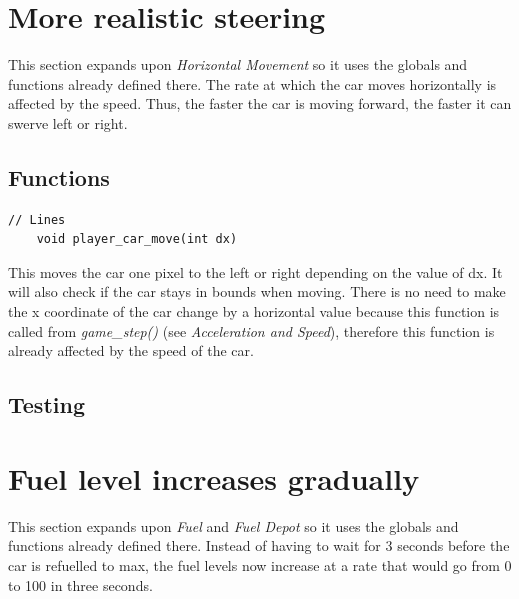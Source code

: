 \documentclass{article}
\begin{document}
\clearpage

\section{More realistic steering}
This section expands upon \emph{Horizontal Movement} so it uses the globals and functions already defined there. The rate at which the car moves horizontally is affected by the speed. Thus, the faster the car is moving forward, the faster it can swerve left or right.

\subsection*{Functions}
\begin{lstlisting}[style=CStyle]
	// Lines
	void player_car_move(int dx)
\end{lstlisting}
This moves the car one pixel to the left or right depending on the value of dx. It will also check if the car stays in bounds when moving. There is no need to make the x coordinate of the car change by a horizontal value because this function is called from \emph{game\_step()} (see \emph{Acceleration and Speed}), therefore this function is already affected by the speed of the car.
\newline

\subsection*{Testing}

\clearpage

\section{Fuel level increases gradually}
This section expands upon \emph{Fuel} and \emph{Fuel Depot}  so it uses the globals and functions already defined there. Instead of having to wait for 3 seconds before the car is refuelled to max, the fuel levels now increase at a rate that would go from 0 to 100 in three seconds.  
\end{document}
